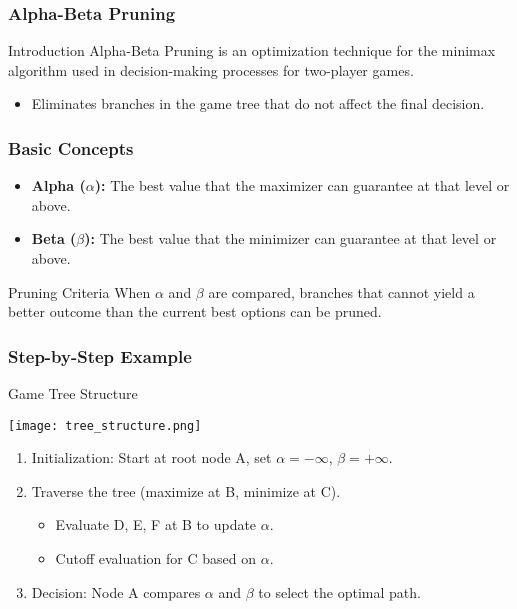 \documentclass[aspectratio=169]{beamer}
\begin{document}
\begin{frame}
    \frametitle{Alpha-Beta Pruning}
    \begin{block}{Introduction}
        Alpha-Beta Pruning is an optimization technique for the minimax algorithm used in decision-making processes for two-player games. 
        \begin{itemize}
            \item Eliminates branches in the game tree that do not affect the final decision.
        \end{itemize}
    \end{block}
\end{frame}

\begin{frame}
    \frametitle{Basic Concepts}
    \begin{itemize}
        \item \textbf{Alpha ($\alpha$):} The best value that the maximizer can guarantee at that level or above.
        \item \textbf{Beta ($\beta$):} The best value that the minimizer can guarantee at that level or above.
    \end{itemize}
    \begin{block}{Pruning Criteria}
        When $\alpha$ and $\beta$ are compared, branches that cannot yield a better outcome than the current best options can be pruned.
    \end{block}
\end{frame}

\begin{frame}
    \frametitle{Step-by-Step Example}
    \begin{block}{Game Tree Structure}
        \begin{center}
            \texttt{[image: tree\_structure.png]} %
        \end{center}
    \end{block}

    \begin{enumerate}
        \item Initialization: Start at root node A, set $\alpha = -\infty$, $\beta = +\infty$.
        \item Traverse the tree (maximize at B, minimize at C).
        \begin{itemize}
            \item Evaluate D, E, F at B to update $\alpha$.
            \item Cutoff evaluation for C based on $\alpha$.
        \end{itemize}
        \item Decision: Node A compares $\alpha$ and $\beta$ to select the optimal path.
    \end{enumerate}
\end{frame}
\end{document}
